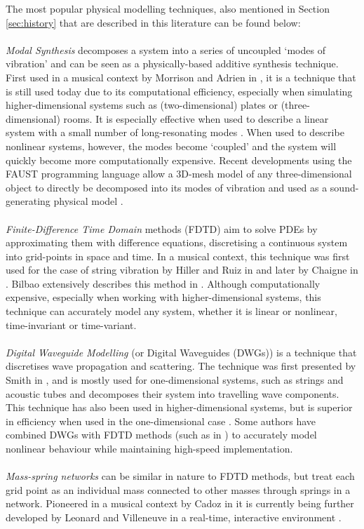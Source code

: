 The most popular physical modelling techniques, also mentioned in Section \ref{sec:history} that are described in this literature can be found below:
\\
\\
\textit{Modal Synthesis} decomposes a system into a series of uncoupled `modes of vibration' and can be seen as a physically-based additive synthesis technique. First used in a musical context by Morrison and Adrien in \cite{Morrison1993}, it is a technique that is still used today due to its computational efficiency, especially when simulating higher-dimensional systems such as (two-dimensional) plates or (three-dimensional) rooms. It is especially effective when used to describe a linear system with a small number of long-resonating modes \cite{Bilbao2018, Smith2010a}. When used to describe nonlinear systems, however, the modes become `coupled’ and the system will quickly become more computationally expensive. Recent developments using the FAUST programming language allow a 3D-mesh model of any three-dimensional object to directly be decomposed into its modes of vibration and used as a sound-generating physical model \cite{MichonMesh2Faust2017}.
\\
\\
\textit{Finite-Difference Time Domain} methods (FDTD) aim to solve PDEs by approximating them with difference equations, discretising a continuous system into grid-points in space and time. In a musical context, this technique was first used for the case of string vibration by Hiller and Ruiz in \cite{Ruiz1969, Hiller1971I, Hiller1971II} and later by Chaigne in \cite{Chaigne1992, Chaigne1994}. Bilbao extensively describes this method in \cite{theBible, Bilbao2018}. Although computationally expensive, especially when working with higher-dimensional systems, this technique can accurately model any system, whether it is linear or nonlinear, time-invariant or time-variant.
\\
\\
\textit{Digital Waveguide Modelling} (or Digital Waveguides (DWGs)) is a technique that discretises wave propagation and scattering. The technique was first presented by Smith in \cite{Smith1992}, and is mostly used for one-dimensional systems, such as strings and acoustic tubes and decomposes their system into travelling wave components. This technique has also been used in higher-dimensional systems, but is superior in efficiency when used in the one-dimensional case \cite{Valimaki2006}. Some authors have combined DWGs with FDTD methods (such as in \cite{Erkut2002, Maestre2014}) to accurately model nonlinear behaviour while maintaining high-speed implementation.
\\
\\
\textit{Mass-spring networks} can be similar in nature to FDTD methods, but treat each grid point as an individual mass connected to other masses through springs in a network. Pioneered in a musical context by Cadoz in \cite{Cadoz1979, Cadoz1983, Cadoz1993} it is currently being further developed by Leonard and Villeneuve in a real-time, interactive environment \cite{Villeneuve2019, Leonard2019}.

